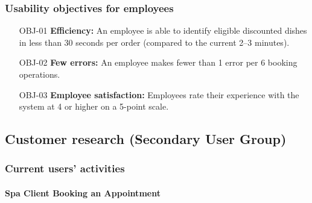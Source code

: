 \documentclass[]{VUMIFTemplateClass}
\newcommand{\noticecomment}[1]{%
    \begin{tcolorbox}[colback=blue!20, colframe=blue!60, arc=0pt, outer arc=0pt, boxrule=1pt, left=3pt, right=3pt, top=3pt, bottom=3pt]
        \textbf{\textcolor{blue!70!black}{NOTE:}} #1
    \end{tcolorbox}
}
\newcommand{\todocomment}[1]{%
    \begin{tcolorbox}[colback=red!20, colframe=red!60, arc=0pt, outer arc=0pt, boxrule=1pt, left=3pt, right=3pt, top=3pt, bottom=3pt]
        \textbf{\textcolor{orange!70!black}{TODO:}} #1
    \end{tcolorbox}
}
\newcommand{\subsubsubsection}[1]{\paragraph{#1}}
\begin{document}
\subsubsection{Usability objectives for employees}
\begin{itemize}
    \item[OBJ-01]\label{OBJ-01} \textbf{Efficiency:} An employee is able to identify eligible discounted dishes in less than 30 seconds per order (compared to the current 2–3 minutes).
  
    \item[OBJ-02]\label{OBJ-02} \textbf{Few errors:} An employee makes fewer than 1 error per 6 booking operations.
    \item[OBJ-03]\label{OBJ-03} \textbf{Employee satisfaction:} Employees rate their experience with the system at 4 or higher on a 5-point scale.

\end{itemize}


\subsection{Customer research (Secondary User Group)}
\subsubsection{Current users' activities}

\subsubsubsection{Spa Client Booking an Appointment}
\label{subsubsubsec:spa-booking}
\end{document}
